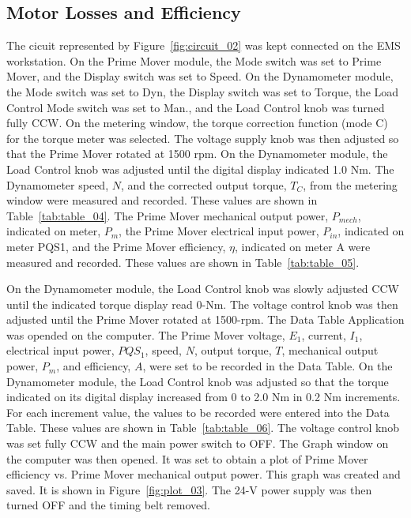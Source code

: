 \documentclass{article}
\begin{document}
\subsection{Motor Losses and Efficiency}

\label{part3} The cicuit represented by Figure~\ref{fig:circuit_02} was kept
connected on the EMS workstation.  On the Prime Mover module, the Mode switch
was set to Prime Mover, and the Display switch was set to Speed. On the
Dynamometer module, the Mode switch was set to Dyn, the Display switch was set
to Torque, the Load Control Mode switch was set to Man., and the Load Control
knob was turned fully {CCW}. On the metering window, the torque correction
function (mode C) for the torque meter was selected. The voltage supply knob
was then adjusted so that the Prime Mover rotated at 1500 rpm. On the
Dynamometer module, the Load Control knob was adjusted until the digital
display indicated 1.0 Nm. The Dynamometer speed, $N$, and the corrected output
torque, $T_C$, from the metering window were measured and recorded. These
values are shown in Table~\ref{tab:table_04}. The Prime Mover mechanical output
power, $P_{mech}$, indicated on meter, $P_m$, the Prime Mover electrical input
power, $P_{in}$, indicated on meter PQS1, and the Prime Mover efficiency,
$\eta$, indicated on meter A were measured and recorded. These values are shown
in Table~\ref{tab:table_05}.

On the Dynamometer module, the Load Control knob was slowly adjusted CCW until
the indicated torque display read 0-Nm. The voltage control knob was then
adjusted until the Prime Mover rotated at 1500-rpm. The Data Table Application
was opended on the computer. The Prime Mover voltage, $E_1$, current, $I_1$,
electrical input power, $PQS_1$, speed, $N$, output torque, $T$, mechanical
output power, $P_{m}$, and efficiency, $A$, were set to be recorded in the Data
Table. On the Dynamometer module, the Load Control knob was adjusted so that
the torque indicated on its digital display increased from 0 to 2.0 Nm in 0.2
Nm increments. For each increment value, the values to be recorded were entered
into the Data Table.  These values are shown in Table~\ref{tab:table_06}. The
voltage control knob was set fully CCW and the main power switch to {OFF}. The
Graph window on the computer was then opened. It was set to obtain a plot of
Prime Mover efficiency vs. Prime Mover mechanical output power. This graph was
created and saved. It is shown in Figure~\ref{fig:plot_03}. The 24-V power
supply was then turned OFF and the timing belt removed.
\end{document}
